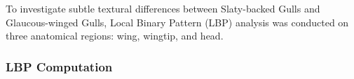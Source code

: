 \documentclass[a4paper,12pt]{report}
\begin{document}
To investigate subtle textural differences between Slaty-backed Gulls and Glaucous-winged Gulls, Local Binary Pattern (LBP) analysis was conducted on three anatomical regions: wing, wingtip, and head.

\subsubsection{LBP Computation}





\end{document}

